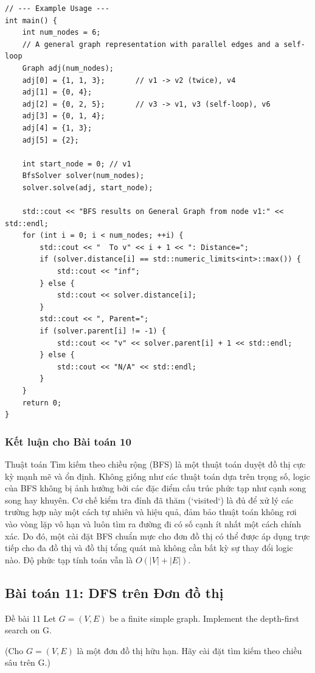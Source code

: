 \documentclass[a4paper,12pt]{article}
\begin{document}
\begin{lstlisting}[style=cppstyle, caption={Cài đặt BFS cho đồ thị tổng quát trong C++.}, label={lst:cpp_bfs_10}]
// --- Example Usage ---
int main() {
    int num_nodes = 6;
    // A general graph representation with parallel edges and a self-loop
    Graph adj(num_nodes);
    adj[0] = {1, 1, 3};       // v1 -> v2 (twice), v4
    adj[1] = {0, 4};
    adj[2] = {0, 2, 5};       // v3 -> v1, v3 (self-loop), v6
    adj[3] = {0, 1, 4};
    adj[4] = {1, 3};
    adj[5] = {2};

    int start_node = 0; // v1
    BfsSolver solver(num_nodes);
    solver.solve(adj, start_node);

    std::cout << "BFS results on General Graph from node v1:" << std::endl;
    for (int i = 0; i < num_nodes; ++i) {
        std::cout << "  To v" << i + 1 << ": Distance=";
        if (solver.distance[i] == std::numeric_limits<int>::max()) {
            std::cout << "inf";
        } else {
            std::cout << solver.distance[i];
        }
        std::cout << ", Parent=";
        if (solver.parent[i] != -1) {
            std::cout << "v" << solver.parent[i] + 1 << std::endl;
        } else {
            std::cout << "N/A" << std::endl;
        }
    }
    return 0;
}
\end{lstlisting}

\subsubsection{Kết luận cho Bài toán 10}
Thuật toán Tìm kiếm theo chiều rộng (BFS) là một thuật toán duyệt đồ thị cực kỳ mạnh mẽ và ổn định. Không giống như các thuật toán dựa trên trọng số, logic của BFS không bị ảnh hưởng bởi các đặc điểm cấu trúc phức tạp như cạnh song song hay khuyên. Cơ chế kiểm tra đỉnh đã thăm (`visited`) là đủ để xử lý các trường hợp này một cách tự nhiên và hiệu quả, đảm bảo thuật toán không rơi vào vòng lặp vô hạn và luôn tìm ra đường đi có số cạnh ít nhất một cách chính xác. Do đó, một cài đặt BFS chuẩn mực cho đơn đồ thị có thể được áp dụng trực tiếp cho đa đồ thị và đồ thị tổng quát mà không cần bất kỳ sự thay đổi logic nào. Độ phức tạp tính toán vẫn là $O(|V| + |E|)$.




\subsection{Bài toán 11: DFS trên Đơn đồ thị}
\begin{problembox}{Đề bài 11}
    Let $G = (V,E)$ be a finite simple graph. Implement the depth-first search on G.
    
    (Cho $G = (V,E)$ là một đơn đồ thị hữu hạn. Hãy cài đặt tìm kiếm theo chiều sâu trên G.)
\end{problembox}
\end{document}
